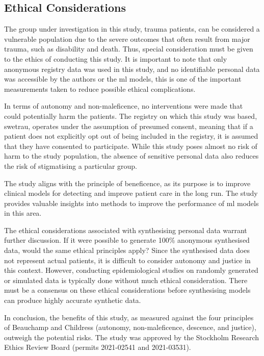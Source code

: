 \documentclass[12pt, a4paper]{article}
\begin{document}
\subsection{Ethical Considerations}
The group under investigation in this study, trauma patients, can be considered a vulnerable population due to the
severe outcomes that often result from major trauma, such as disability and death. Thus, special consideration must be
given to the ethics of conducting this study. It is important to note that only anonymous registry data was used in
this study, and no identifiable personal data was accessible by the authors or the \acrshort{ml} models, this is one of
the important measurements taken to reduce possible ethical complications.

In terms of autonomy and non-maleficence, no interventions were made that could potentially harm the patients. The
registry on which this study was based, \acrshort{swetrau}, operates under the assumption of presumed consent, meaning
that if a patient does not explicitly opt out of being included in the registry, it is assumed that they have consented
to participate. While this study poses almost no risk of harm to the study population, the absence of sensitive
personal data also reduces the risk of stigmatising a particular group.

The study aligns with the principle of beneficence, as its purpose is to improve clinical models for detecting
 and improve patient care in the long run. The study provides valuable insights into methods to improve
the performance of \acrshort{ml} models in this area.

The ethical considerations associated with synthesising personal data warrant further discussion. If it were possible
to generate 100\% anonymous synthesised data, would the same ethical principles apply? Since the synthesised data does
not represent actual patients, it is difficult to consider autonomy and justice in this context. However, conducting
epidemiological studies on randomly generated or simulated data is typically done without much ethical consideration.
There must be a consensus on these ethical considerations before synthesising models can produce highly accurate
synthetic data.

In conclusion, the benefits of this study, as measured against the four principles of Beauchamp and Childress
(autonomy, non-maleficence, descence, and justice), outweigh the potential risks. The study was approved by the
Stockholm Research Ethics Review Board (permits 2021-02541 and 2021-03531).
\end{document}

